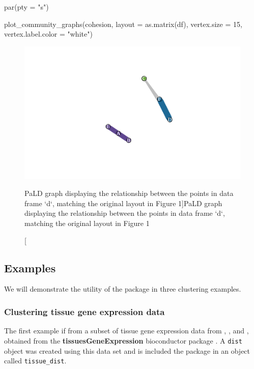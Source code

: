 \begin{Schunk}
\begin{Sinput}
par(pty = "s")

plot_community_graphs(cohesion, 
                      layout = as.matrix(df),
                      vertex.size = 15,
                      vertex.label.color = "white")
\end{Sinput}
\begin{figure}
\includegraphics{manuscript_files/figure-latex/fig3-1} \caption[PaLD graph displaying the relationship between the points in data frame `d`, matching the original layout in Figure 1]{PaLD graph displaying the relationship between the points in data frame `d`, matching the original layout in Figure 1}\label{fig:fig3}
\end{figure}
\end{Schunk}

\hypertarget{examples}{%
\subsection{Examples}\label{examples}}

We will demonstrate the utility of the  package in three
clustering examples.

\hypertarget{clustering-tissue-gene-expression-data}{%
\subsubsection{Clustering tissue gene expression
data}\label{clustering-tissue-gene-expression-data}}

The first example if from a subset of tissue gene expression data from
\citet{zilliox2007gene}, \citet{mccall2011gene}, and
\citet{mccall2014gene}, obtained from the \textbf{tissuesGeneExpression}
bioconductor package \citep{tissue}. A \texttt{dist} object was created
using this data set and is included the  package in an
object called \texttt{tissue\_dist}.

